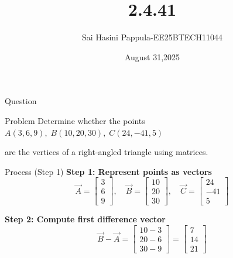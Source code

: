 \documentclass{beamer}
\title %
{2.4.41}
\date{August 31,2025}
\author %
{Sai Hasini Pappula-EE25BTECH11044}
\begin{document}
\begin{frame}
  \titlepage
\end{frame}

\begin{frame}{Question}
\begin{block}{Problem}
Determine whether the points 
$A(3,6,9), \; B(10,20,30), \; C(24,-41,5)$

are the vertices of a right-angled triangle using matrices.
\end{block}
\end{frame}

\begin{frame}{Process (Step 1)}
\textbf{Step 1: Represent points as vectors} \\
\begin{equation}
\vec{A}=\begin{bmatrix}3\\6\\9\end{bmatrix}, \quad
\vec{B}=\begin{bmatrix}10\\20\\30\end{bmatrix}, \quad
\vec{C}=\begin{bmatrix}24\\-41\\5\end{bmatrix}
\end{equation}

\textbf{Step 2: Compute first difference vector} \\
\begin{equation}
\vec{B}-\vec{A} =
\begin{bmatrix}10-3\\20-6\\30-9\end{bmatrix} =
\begin{bmatrix}7\\14\\21\end{bmatrix}
\end{equation}
\end{frame}
\end{document}
